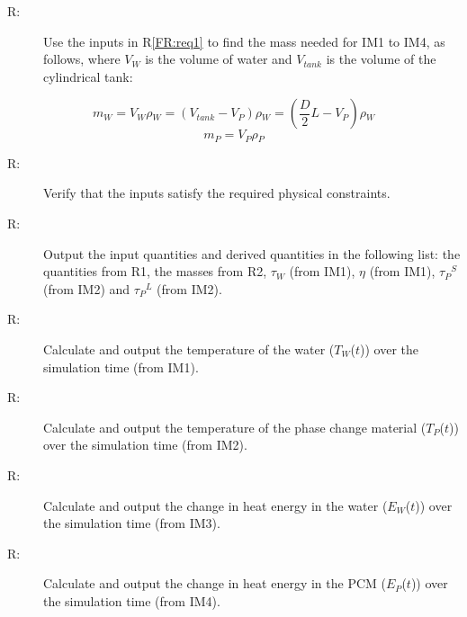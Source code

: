 \documentclass[12pt]{article}
\newcounter{reqnum}
\newcommand{\rthereqnum}{R\thereqnum}
\begin{document}
\begin{description}
\item[\rthereqnum\label{FR:req2}:]Use the inputs in R\ref{FR:req1} to find the mass needed for IM1 to IM4, as follows, where ${V_{W}}$ is the volume of water and ${V_{tank}}$ is the volume of the cylindrical tank:
\end{description}
\begin{dmath}
{m_{W}}={V_{W}} {\rho{}_{W}}=\left({V_{tank}}-{V_{P}}\right) {\rho{}_{W}}=\left(\frac{D}{2} L-{V_{P}}\right) {\rho{}_{W}}
\end{dmath}
\begin{dmath}
{m_{P}}={V_{P}} {\rho{}_{P}}
\end{dmath}
\begin{description}
\item[\rthereqnum\label{FR:req3}:]Verify that the inputs satisfy the required physical constraints.
\end{description}
\begin{description}
\item[\rthereqnum\label{FR:req4}:]Output the input quantities and derived quantities in the following list: the quantities from R1, the masses from R2, ${\tau{}_{W}}$ (from IM1), $\eta{}$ (from IM1), ${{\tau{}_{P}}^{S}}$ (from IM2) and ${{\tau{}_{P}}^{L}}$ (from IM2).
\end{description}
\begin{description}
\item[\rthereqnum\label{FR:req5}:]Calculate and output the temperature of the water (${T_{W}}$($t$)) over the simulation time (from IM1).
\end{description}
\begin{description}
\item[\rthereqnum\label{FR:req6}:]Calculate and output the temperature of the phase change material (${T_{P}}$($t$)) over the simulation time (from IM2).
\end{description}
\begin{description}
\item[\rthereqnum\label{FR:req7}:]Calculate and output the change in heat energy in the water (${E_{W}}$($t$)) over the simulation time (from IM3).
\end{description}
\begin{description}
\item[\rthereqnum\label{FR:req8}:]Calculate and output the change in heat energy in the PCM (${E_{P}}$($t$)) over the simulation time (from IM4).
\end{description}
\end{document}
